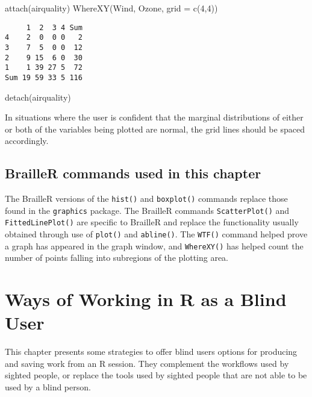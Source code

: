 \documentclass[
]{book}
\newenvironment{Shaded}{\begin{snugshade}}{\end{snugshade}}
\newcommand{\AttributeTok}[1]{\textcolor[rgb]{0.77,0.63,0.00}{#1}}
\newcommand{\DecValTok}[1]{\textcolor[rgb]{0.00,0.00,0.81}{#1}}
\newcommand{\FunctionTok}[1]{\textcolor[rgb]{0.00,0.00,0.00}{#1}}
\newcommand{\NormalTok}[1]{#1}
\begin{document}
\begin{Shaded}
\begin{Highlighting}[]
\FunctionTok{attach}\NormalTok{(airquality)}
\FunctionTok{WhereXY}\NormalTok{(Wind, Ozone, }\AttributeTok{grid =} \FunctionTok{c}\NormalTok{(}\DecValTok{4}\NormalTok{,}\DecValTok{4}\NormalTok{))}
\end{Highlighting}
\end{Shaded}

\begin{verbatim}
     1  2  3 4 Sum
4    2  0  0 0   2
3    7  5  0 0  12
2    9 15  6 0  30
1    1 39 27 5  72
Sum 19 59 33 5 116
\end{verbatim}

\begin{Shaded}
\begin{Highlighting}[]
\FunctionTok{detach}\NormalTok{(airquality)}
\end{Highlighting}
\end{Shaded}

In situations where the user is confident that the marginal distributions of either or both of the variables being plotted are normal, the grid lines should be spaced accordingly.

\hypertarget{brailler-commands-used-in-this-chapter-2}{%
\section{BrailleR commands used in this chapter}\label{brailler-commands-used-in-this-chapter-2}}

The BrailleR versions of the \texttt{hist()} and \texttt{boxplot()} commands replace those found in the \texttt{graphics} package. The BrailleR commands \texttt{ScatterPlot()} and \texttt{FittedLinePlot()} are specific to BrailleR and replace the functionality usually obtained through use of \texttt{plot()} and \texttt{abline()}. The \texttt{WTF()} command helped prove a graph has appeared in the graph window, and \texttt{WhereXY()} has helped count the number of points falling into subregions of the plotting area.

\hypertarget{WorkingBlind}{%
\chapter{Ways of Working in R as a Blind User}\label{WorkingBlind}}

This chapter presents some strategies to offer blind users options for producing and saving work from an R session. They complement the workflows used by sighted people, or replace the tools used by sighted people that are not able to be used by a blind person.
\end{document}
